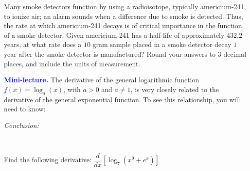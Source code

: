 \documentclass[10pt]{article}
\begin{document}
Many smoke detectors function by using a radioisotope, typically americium-241, to ionize air; an alarm sounds when a difference due to smoke is detected. Thus, the rate at which americium-241 decays is of critical importance in the function of a smoke detector. Given americium-241 has a half-life of approximately $432.2$ years, at what rate does a $10$ gram sample placed in a smoke detector decay $1$ year after the smoke detector is manufactured? Round your answers to 3 decimal places, and include the units of measurement.

\vfill


\reversemarginpar{} {\bf \textcolor{blue}{Mini-lecture.}} The derivative of the general logarithmic function $f(x)=\log_a(x)$, with $a>0$ and $a\neq1$, is very closely related to the derivative of the general exponential function. To see this relationship, you will need to know:



\vspace{3in}
{\em Conclusion:}


\newpage%

  \reversemarginpar {} \\
 \hfill {}\hfill {}\hfill {}


 Find the following derivative: $\dfrac{d}{dx}\left[ \log_7(x^9+e^x) \right]$\\
\vfill
\end{document}
